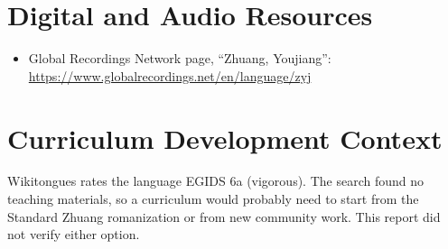 \documentclass[12pt]{article}
\begin{document}
\section{Digital and Audio Resources}
\begin{itemize}
\item Global Recordings Network page, ``Zhuang, Youjiang'': \url{https://www.globalrecordings.net/en/language/zyj}
\end{itemize}

\section{Curriculum Development Context}
Wikitongues rates the language EGIDS 6a (vigorous). The search found no teaching materials, so a curriculum would probably need to start from the Standard Zhuang romanization or from new community work. This report did not verify either option.
\end{document}
